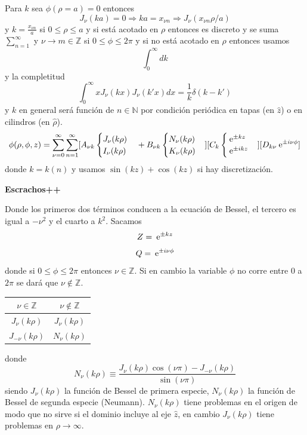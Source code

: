 \documentclass[10pt,oneside]{CBFT_book}
\begin{document}
Para $k$ sea $\phi(\rho=a)=0$ entonces 
\[
	J_\nu(ka) = 0 \Rightarrow ka=x_{\nu n} \Rightarrow J_\nu (x_{\nu n} \rho/a)
\]
y $k=\frac{x_{\nu n}}{a}$ si $0\leq \rho \leq a$ y si está acotado en $\rho$ entonces es discreto y se
suma $\sum_{n=1}^\infty$ y $\nu\to m \in \mathbb{Z}$ si $0 \leq \phi \leq 2\pi$ y si no está acotado en
$\rho$ entonces usamos 
\[
	\int_0^\infty dk
\]
y la completitud
\[
	\int_0^\infty x J_\nu(kx) J_\nu(k'x) dx = \frac{1}{k} \delta (k-k')
\]
y $k$ en general será función de $n\in \mathbb{N}$ por condición periódica en tapas (en $\hat{z}$) o en
cilindros (en $\hat{\rho}$).
\[
	\phi(\rho,\phi,z) = \sum_{\nu=0}^\infty \sum_{n=1}^\infty
	[A_{\nu k}\begin{cases} J_\nu(k\rho)  \\ I_\nu(k\rho) \end{cases} + 
	B_{\nu k} \begin{cases} N_\nu(k\rho)  \\ K_\nu(k\rho) \end{cases} ]
	[C_k \begin{cases} \:\mathrm{e}^{\pm kz} \\ \:\mathrm{e}^{\pm ikz} \end{cases}]
	[D_{k\nu} \:\mathrm{e}^{\pm i \nu \phi}]
\]
donde $k=k(n)$ y usamos $\sin(kz)+\cos(kz)$ si hay discretización.

{\bf Escrachos++}

Donde los primeros dos términos conducen a la ecuación de Bessel, el tercero es igual a $-\nu^2$ y el
cuarto a $k^2$. Sacamos
\[
	Z = \:\mathrm{e}^{\pm kz}
\]
\[
	Q = \:\mathrm{e}^{\pm i \nu \phi}
\]
donde si $0\leq \phi \leq 2\pi$ entonces $\nu \in \mathbb{Z}$. Si en cambio la variable $\phi$ no corre 
entre $0$ a $2\pi$ se dará que $\nu \notin \mathbb{Z}$.

\begin{center}
	\begin{tabular}{|c|c|}
	\hline
	$ \nu \in \mathbb{Z} $ & $ \nu \notin \mathbb{Z}  $ \\
	\hline
	$J_\nu(k\rho)$ & $J_\nu(k\rho)$ \\
	$J_{-\nu}(k\rho)$ & $N_\nu(k\rho)$ \\
	\hline
	\end{tabular} 
\end{center}
donde 
\[
	N_\nu(k\rho) \equiv \frac{ J_\nu(k\rho) \cos(\nu\pi) - J_{-\nu}(k\rho)}{\sin(\nu\pi)}
\]
siendo $J_\nu(k\rho)$ la función de Bessel de primera especie, $N_\nu(k\rho)$ la función de Bessel de segunda 
especie (Neumann).
$N_\nu(k\rho)$ tiene problemas en el origen de modo que no sirve si el dominio incluye al eje $\hat{z}$, en 
cambio $J_\nu(k\rho)$ tiene problemas en $\rho\to \infty$.

\end{document}
